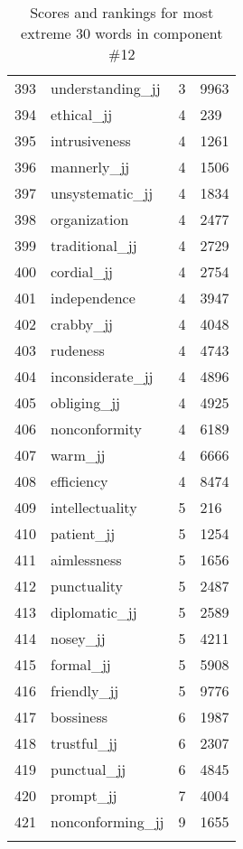 \begin{longtable}[!htbp]{| rlr@{.}l |}
    393 & understanding\_jj & 3 & 9963 \\
    394 & ethical\_jj & 4 & 239 \\
    395 & intrusiveness & 4 & 1261 \\
    396 & mannerly\_jj & 4 & 1506 \\
    397 & unsystematic\_jj & 4 & 1834 \\
    398 & organization & 4 & 2477 \\
    399 & traditional\_jj & 4 & 2729 \\
    400 & cordial\_jj & 4 & 2754 \\
    401 & independence & 4 & 3947 \\
    402 & crabby\_jj & 4 & 4048 \\
    403 & rudeness & 4 & 4743 \\
    404 & inconsiderate\_jj & 4 & 4896 \\
    405 & obliging\_jj & 4 & 4925 \\
    406 & nonconformity & 4 & 6189 \\
    407 & warm\_jj & 4 & 6666 \\
    408 & efficiency & 4 & 8474 \\
    409 & intellectuality & 5 & 216 \\
    410 & patient\_jj & 5 & 1254 \\
    411 & aimlessness & 5 & 1656 \\
    412 & punctuality & 5 & 2487 \\
    413 & diplomatic\_jj & 5 & 2589 \\
    414 & nosey\_jj & 5 & 4211 \\
    415 & formal\_jj & 5 & 5908 \\
    416 & friendly\_jj & 5 & 9776 \\
    417 & bossiness & 6 & 1987 \\
    418 & trustful\_jj & 6 & 2307 \\
    419 & punctual\_jj & 6 & 4845 \\
    420 & prompt\_jj & 7 & 4004 \\
    421 & nonconforming\_jj & 9 & 1655 \\
    \hline
    \caption{Scores and rankings for most extreme 30 words in component \#12} \\
\end{longtable}

